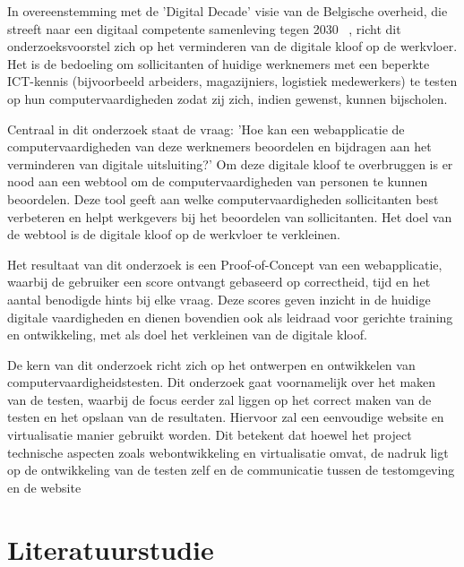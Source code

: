 In overeenstemming met de 'Digital Decade' visie van de Belgische overheid, die streeft naar een digitaal competente samenleving tegen 2030 ~\autocite{DigitalDecade2030}, richt dit onderzoeksvoorstel zich op het verminderen van de digitale kloof op de werkvloer. Het is de bedoeling om sollicitanten of huidige werknemers met een beperkte ICT-kennis (bijvoorbeeld arbeiders, magazijniers, logistiek medewerkers) te testen op hun computervaardigheden zodat zij zich, indien gewenst, kunnen bijscholen.

Centraal in dit onderzoek staat de vraag: 'Hoe kan een webapplicatie de computervaardigheden van deze werknemers beoordelen en bijdragen aan het verminderen van digitale uitsluiting?' Om deze digitale kloof te overbruggen is er nood aan een webtool om de computervaardigheden van personen te kunnen beoordelen.
Deze tool geeft aan welke computervaardigheden sollicitanten best verbeteren en helpt werkgevers bij het beoordelen van sollicitanten. Het doel van de webtool is de digitale kloof op de werkvloer te verkleinen.

Het resultaat van dit onderzoek is een Proof-of-Concept van een webapplicatie, waarbij de gebruiker een score ontvangt gebaseerd op correctheid, tijd en het aantal benodigde hints bij elke vraag. Deze scores geven inzicht in de huidige digitale vaardigheden en dienen bovendien ook als leidraad voor gerichte training en ontwikkeling, met als doel het verkleinen van de digitale kloof.

De kern van dit onderzoek richt zich op het ontwerpen en ontwikkelen van computervaardigheidstesten. Dit onderzoek gaat voornamelijk over het maken van de testen, waarbij de focus eerder zal liggen op het correct maken van de testen en het opslaan van de resultaten. Hiervoor zal een eenvoudige website en virtualisatie manier gebruikt worden. Dit betekent dat hoewel het project technische aspecten zoals webontwikkeling en virtualisatie omvat, de nadruk ligt op de ontwikkeling van de testen zelf en de communicatie tussen de testomgeving en de website


\section{Literatuurstudie}%
\label{sec:state-of-the-art}


